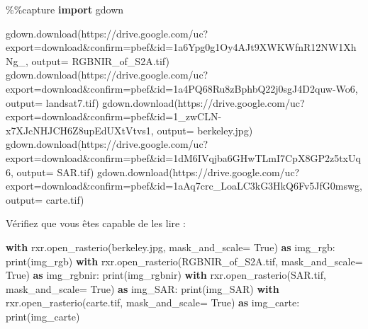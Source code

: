 \documentclass[
]{article}
\newenvironment{Shaded}{}{}
\newcommand{\BuiltInTok}[1]{\textcolor[rgb]{0.00,0.50,0.00}{#1}}
\newcommand{\ControlFlowTok}[1]{\textcolor[rgb]{0.00,0.44,0.13}{\textbf{#1}}}
\newcommand{\ImportTok}[1]{\textcolor[rgb]{0.00,0.50,0.00}{\textbf{#1}}}
\newcommand{\NormalTok}[1]{#1}
\newcommand{\OperatorTok}[1]{\textcolor[rgb]{0.40,0.40,0.40}{#1}}
\newcommand{\StringTok}[1]{\textcolor[rgb]{0.25,0.44,0.63}{#1}}
\newcommand{\VariableTok}[1]{\textcolor[rgb]{0.10,0.09,0.49}{#1}}
\begin{document}
\label{71611bf4}
\label{cb3}
\begin{Shaded}
\begin{Highlighting}[]
\OperatorTok{\%\%}\NormalTok{capture}
\ImportTok{import}\NormalTok{ gdown}

\NormalTok{gdown.download(}\StringTok{\textquotesingle{}https://drive.google.com/uc?export=download\&confirm=pbef\&id=1a6Ypg0g1Oy4AJt9XWKWfnR12NW1XhNg\_\textquotesingle{}}\NormalTok{, output}\OperatorTok{=} \StringTok{\textquotesingle{}RGBNIR\_of\_S2A.tif\textquotesingle{}}\NormalTok{)}
\NormalTok{gdown.download(}\StringTok{\textquotesingle{}https://drive.google.com/uc?export=download\&confirm=pbef\&id=1a4PQ68Ru8zBphbQ22j0sgJ4D2quw{-}Wo6\textquotesingle{}}\NormalTok{, output}\OperatorTok{=} \StringTok{\textquotesingle{}landsat7.tif\textquotesingle{}}\NormalTok{)}
\NormalTok{gdown.download(}\StringTok{\textquotesingle{}https://drive.google.com/uc?export=download\&confirm=pbef\&id=1\_zwCLN{-}x7XJcNHJCH6Z8upEdUXtVtvs1\textquotesingle{}}\NormalTok{, output}\OperatorTok{=} \StringTok{\textquotesingle{}berkeley.jpg\textquotesingle{}}\NormalTok{)}
\NormalTok{gdown.download(}\StringTok{\textquotesingle{}https://drive.google.com/uc?export=download\&confirm=pbef\&id=1dM6IVqjba6GHwTLmI7CpX8GP2z5txUq6\textquotesingle{}}\NormalTok{, output}\OperatorTok{=} \StringTok{\textquotesingle{}SAR.tif\textquotesingle{}}\NormalTok{)}
\NormalTok{gdown.download(}\StringTok{\textquotesingle{}https://drive.google.com/uc?export=download\&confirm=pbef\&id=1aAq7crc\_LoaLC3kG3HkQ6Fv5JfG0mswg\textquotesingle{}}\NormalTok{, output}\OperatorTok{=} \StringTok{\textquotesingle{}carte.tif\textquotesingle{}}\NormalTok{)}
\end{Highlighting}
\end{Shaded}

Vérifiez que vous êtes capable de les lire :

\label{753fec9b}
\label{cb4}
\begin{Shaded}
\begin{Highlighting}[]
\ControlFlowTok{with}\NormalTok{ rxr.open\_rasterio(}\StringTok{\textquotesingle{}berkeley.jpg\textquotesingle{}}\NormalTok{, mask\_and\_scale}\OperatorTok{=} \VariableTok{True}\NormalTok{) }\ImportTok{as}\NormalTok{ img\_rgb:}
    \BuiltInTok{print}\NormalTok{(img\_rgb)}
\ControlFlowTok{with}\NormalTok{ rxr.open\_rasterio(}\StringTok{\textquotesingle{}RGBNIR\_of\_S2A.tif\textquotesingle{}}\NormalTok{, mask\_and\_scale}\OperatorTok{=} \VariableTok{True}\NormalTok{) }\ImportTok{as}\NormalTok{ img\_rgbnir:}
    \BuiltInTok{print}\NormalTok{(img\_rgbnir)}
\ControlFlowTok{with}\NormalTok{ rxr.open\_rasterio(}\StringTok{\textquotesingle{}SAR.tif\textquotesingle{}}\NormalTok{, mask\_and\_scale}\OperatorTok{=} \VariableTok{True}\NormalTok{) }\ImportTok{as}\NormalTok{ img\_SAR:}
    \BuiltInTok{print}\NormalTok{(img\_SAR)}
\ControlFlowTok{with}\NormalTok{ rxr.open\_rasterio(}\StringTok{\textquotesingle{}carte.tif\textquotesingle{}}\NormalTok{, mask\_and\_scale}\OperatorTok{=} \VariableTok{True}\NormalTok{) }\ImportTok{as}\NormalTok{ img\_carte:}
    \BuiltInTok{print}\NormalTok{(img\_carte)}
\end{Highlighting}
\end{Shaded}
\end{document}
